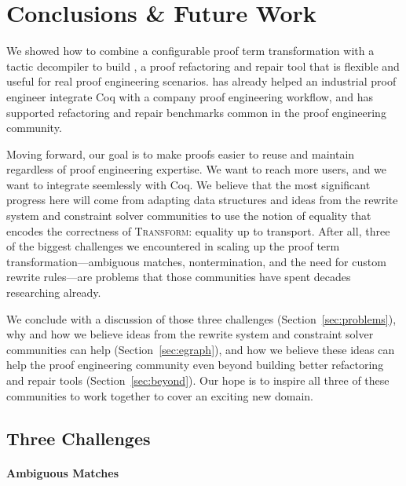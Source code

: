 \section{Conclusions \& Future Work}
\label{sec:discussion}

We showed how to combine a configurable proof term transformation with a tactic decompiler to build \toolname,
a proof refactoring and repair tool that is flexible and useful for real proof engineering scenarios.
\toolname has already helped an industrial proof engineer integrate Coq with a company proof engineering workflow,
and has supported refactoring and repair benchmarks common in the proof engineering community.

Moving forward, our goal is to make proofs easier to reuse and maintain regardless of proof engineering expertise.
We want to reach more users, and we want \toolname to integrate seemlessly with Coq.
We believe that the most significant progress here will come from adapting data structures and ideas
from the rewrite system and constraint solver communities to use the notion of equality that encodes the correctness of \textsc{Transform}: equality up 
to transport. After all, three of the biggest challenges we encountered in scaling up the \toolname proof term transformation---ambiguous matches, nontermination, and the need for custom rewrite rules---are problems that those communities have spent decades researching already.%

We conclude with a discussion of those three challenges (Section~\ref{sec:problems}), why and how we believe ideas from the rewrite system and constraint
solver communities can help (Section~\ref{sec:egraph}), and how we believe these ideas can help the proof engineering community
even beyond building better refactoring and repair tools (Section~\ref{sec:beyond}).
Our hope is to inspire all three of these communities to work together to cover an exciting new domain.

\subsection{Three Challenges}


\paragraph{Ambiguous Matches}

